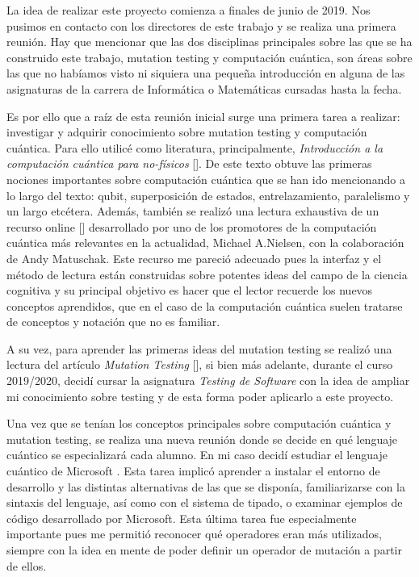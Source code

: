 La idea de realizar este proyecto comienza a finales de junio de 2019. Nos pusimos en contacto con los directores de este trabajo y se realiza una primera reunión. Hay que mencionar que las dos disciplinas principales sobre las que se ha construido este trabajo, mutation testing y computación cuántica, son áreas sobre las que no habíamos visto ni siquiera una pequeña introducción en alguna de las asignaturas de la carrera de Informática o Matemáticas cursadas hasta la fecha.

Es por ello que a raíz de esta reunión inicial surge una primera tarea a realizar: investigar y adquirir conocimiento sobre mutation testing y computación cuántica. Para ello utilicé como literatura, principalmente, \textit{Introducción a la computación cuántica para no-físicos} [\cite{rieffel2000introduction}]. De este texto obtuve las primeras nociones importantes sobre computación cuántica que se han ido mencionando a lo largo del texto: qubit, superposición de estados, entrelazamiento, paralelismo y un largo etcétera. Además, también se realizó una lectura exhaustiva de un recurso online [\cite{quantumcountry}] desarrollado por uno de los promotores de la computación cuántica más relevantes en la actualidad, Michael A.Nielsen, con la colaboración de Andy Matuschak. Este recurso me pareció adecuado pues la interfaz y el método de lectura están construidas sobre potentes ideas del campo de la ciencia cognitiva y su principal objetivo es hacer que el lector recuerde los nuevos conceptos aprendidos, que en el caso de la computación cuántica suelen tratarse de conceptos y notación que no es familiar.

A su vez, para aprender las primeras ideas del mutation testing se realizó una lectura del artículo \textit{Mutation Testing} [\cite{hierons2010mutation}], si bien más adelante, durante el curso 2019/2020, decidí cursar la asignatura \textit{Testing de Software} con la idea de ampliar mi conocimiento sobre testing y de esta forma poder aplicarlo a este proyecto.

Una vez que se tenían los conceptos principales sobre computación cuántica y mutation testing, se realiza una nueva reunión donde se decide en qué lenguaje cuántico se especializará cada alumno. En mi caso decidí estudiar el lenguaje cuántico de Microsoft \qsh. Esta tarea implicó aprender a instalar el entorno de desarrollo y las distintas alternativas de las que se disponía, familiarizarse con la sintaxis del lenguaje, así como con el sistema de tipado, o examinar ejemplos de código desarrollado por Microsoft. Esta última tarea fue especialmente importante pues me permitió reconocer qué operadores eran más utilizados, siempre con la idea en mente de poder definir un operador de mutación a partir de ellos.

